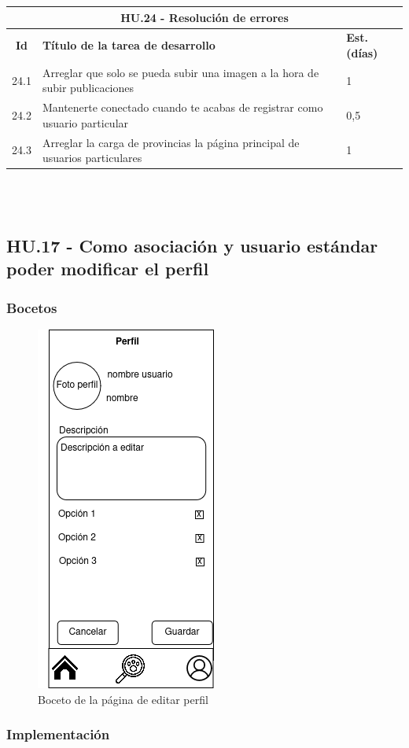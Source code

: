 \begin{tabular}{|c|p{9.5cm}|p{1cm}|}
	\hline
	\multicolumn{3}{|c|}{\textbf{HU.24 - Resolución de errores}} \\
	\hline
	\textbf{Id} & \textbf{Título de la tarea de desarrollo} & \textbf{Est. (días)} \\
	\hline
	24.1 & Arreglar que solo se pueda subir una imagen a la hora de subir publicaciones  & 1 \\ \hline
	24.2 & Mantenerte conectado cuando te acabas de registrar como usuario particular & 0,5 \\ \hline
	24.3 & Arreglar la carga de provincias la página principal de usuarios particulares & 1 \\ \hline
\end{tabular} \\ \\


\subsection{HU.17 - Como asociación y usuario estándar poder modificar el perfil}

\subsubsection{Bocetos}

\begin{figure}[H]
	\centering
	\includegraphics[width=0.31\linewidth]{"sprint 4/hu17/editarPerfil"}
	\caption{Boceto de la página de editar perfil}
	\label{fig:editarperfil}
\end{figure}

\subsubsection{Implementación}

